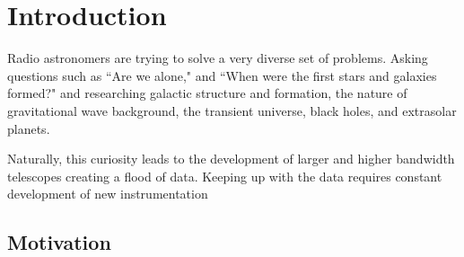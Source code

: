 \chapter{Introduction}
Radio astronomers are trying to solve a very diverse set of problems.
Asking questions such as ``Are we alone," and ``When were the first stars and galaxies formed?" and researching galactic structure and formation, the nature of gravitational wave background, the transient universe, black holes, and extrasolar planets.

Naturally, this curiosity leads to the development of larger and higher bandwidth telescopes creating a flood of data.
Keeping up with the data requires constant development of new instrumentation 


\section{Motivation}

